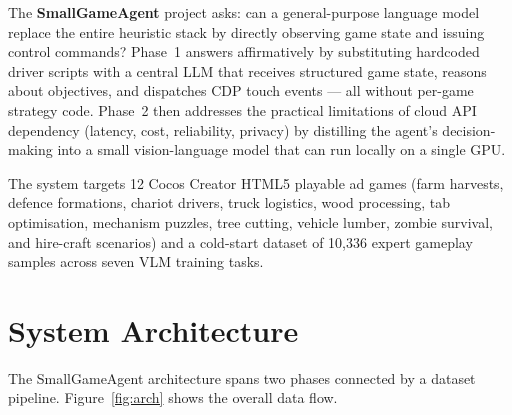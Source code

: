 \documentclass[11pt,a4paper]{article}
\begin{document}
The \textbf{SmallGameAgent} project asks: can a general-purpose language model replace the entire heuristic stack by directly observing game state and issuing control commands? Phase~1 answers affirmatively by substituting hardcoded driver scripts with a central LLM that receives structured game state, reasons about objectives, and dispatches CDP touch events — all without per-game strategy code. Phase~2 then addresses the practical limitations of cloud API dependency (latency, cost, reliability, privacy) by distilling the agent's decision-making into a small vision-language model that can run locally on a single GPU.

The system targets 12 Cocos Creator HTML5 playable ad games (farm harvests, defence formations, chariot drivers, truck logistics, wood processing, tab optimisation, mechanism puzzles, tree cutting, vehicle lumber, zombie survival, and hire-craft scenarios) and a cold-start dataset of 10,336 expert gameplay samples across seven VLM training tasks.

\section{System Architecture}

The SmallGameAgent architecture spans two phases connected by a dataset pipeline. Figure~\ref{fig:arch} shows the overall data flow.
\end{document}
